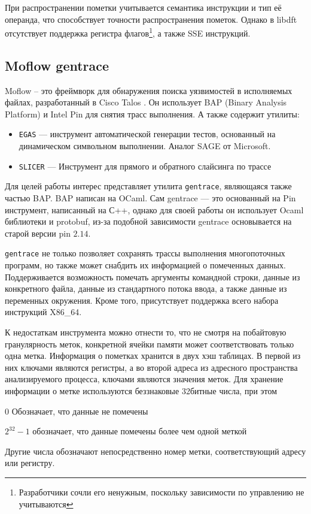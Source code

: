 При распространении пометки учитывается семантика инструкции и тип её операнда, что способствует точности распространения пометок. Однако в libdft отсутствует поддержка регистра флагов\footnote{Разработчики сочли его ненужным, поскольку зависимости по управлению не учитываются}, а также SSE инструкций.

\subsection{Moflow gentrace}

Moflow -- это фреймворк для обнаружения поиска уязвимостей в исполняемых файлах, разработанный в Cisco Talos \cite{moflow}. Он использует BAP (Binary Analysis Platform) и Intel Pin для снятия трасс выполнения.
А также содержит утилиты:
\begin{itemize}
    \item \texttt{EGAS} --- инструмент автоматической генерации тестов, основанный на динамическом символьном выполнении. Аналог SAGE от Microsoft.
    \item \texttt{SLICER} --- Инструмент для прямого и обратного слайсинга по трассе
\end{itemize}

Для целей работы интерес представляет утилита \texttt{gentrace}, являющаяся также частью BAP. BAP написан на OCaml. Сам gentrace --- это основанный на Pin инструмент, написанный на С++, однако для своей работы он использует Ocaml библиотеки и protobuf, из-за подобной зависимости gentrace основывается на старой версии pin $2.14$.

\texttt{gentrace} не только позволяет сохранять трассы выполнения многопоточных программ, но также может снабдить их информацией о помеченных данных. Поддерживается возможность помечать аргументы командной строки, данные из конкретного файла, данные из стандартного потока ввода, а также данные из переменных окружения.
Кроме того, присутствует поддержка всего набора инструкций X86\_64.

К недостаткам инструмента можно отнести то, что не смотря на побайтовую гранулярность меток, конкретной ячейки памяти может соответствовать только одна метка. Информация о пометках хранится в двух хэш таблицах. В первой из них ключами являются регистры, а во второй адреса из адресного пространства анализируемого процесса, ключами являются значения меток. 
Для хранение информации о метке используются беззнаковые 32битные числа, при этом
\begin{enumarate}
    \item $0$ Обозначает, что данные не помечены
    \item $2^{32} - 1$ обозначает, что данные помечены более чем одной меткой
    \item Другие числа обозначают непосредственно номер метки, соответствующий адресу или регистру.
\end{enumarate}

